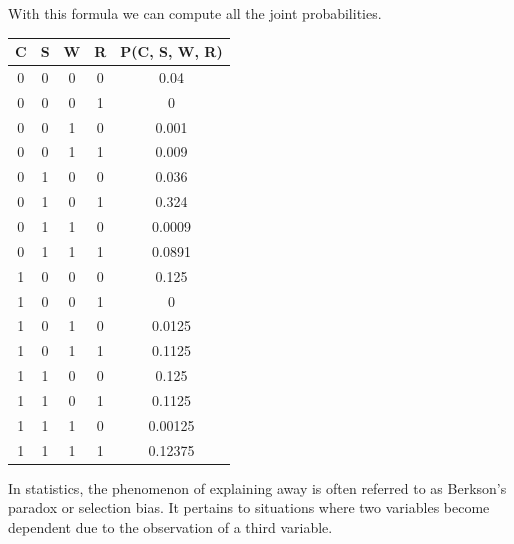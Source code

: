 \begin{example}
\[    \]
    With this formula we can compute all the joint probabilities.
    \begin{table}[H]
        \centering
        \begin{tabular}{cccc|c}
        \hline
        \textbf{C} & \textbf{S} & \textbf{W} & \textbf{R} & \textbf{P(C, S, W, R)} \\ \hline
        0          & 0          & 0          & 0          & 0.04                \\
        0          & 0          & 0          & 1          & 0                   \\
        0          & 0          & 1          & 0          & 0.001               \\
        0          & 0          & 1          & 1          & 0.009               \\
        0          & 1          & 0          & 0          & 0.036               \\
        0          & 1          & 0          & 1          & 0.324               \\
        0          & 1          & 1          & 0          & 0.0009              \\
        0          & 1          & 1          & 1          & 0.0891              \\
        1          & 0          & 0          & 0          & 0.125               \\
        1          & 0          & 0          & 1          & 0                   \\
        1          & 0          & 1          & 0          & 0.0125              \\
        1          & 0          & 1          & 1          & 0.1125              \\
        1          & 1          & 0          & 0          & 0.125               \\
        1          & 1          & 0          & 1          & 0.1125              \\
        1          & 1          & 1          & 0          & 0.00125             \\
        1          & 1          & 1          & 1          & 0.12375             \\ \hline
        \end{tabular}
    \end{table}
\end{example}
In statistics, the phenomenon of explaining away is often referred to as Berkson's paradox or selection bias. It pertains to situations where two variables become dependent due to the observation of a third variable. 


